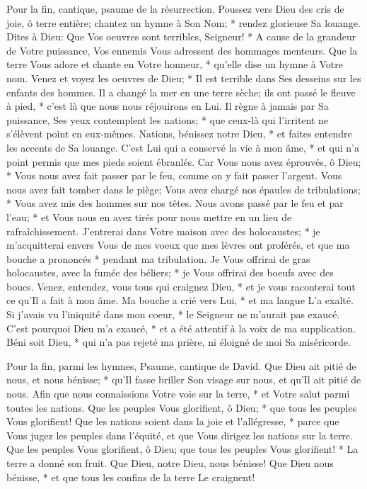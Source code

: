 Pour la fin, cantique, psaume de la résurrection. Poussez vers Dieu des cris de joie, ô terre entière;
chantez un hymne à Son Nom; * rendez glorieuse Sa louange.
Dites à Dieu: Que Vos oeuvres sont terribles, Seigneur! * A cause de la grandeur de Votre puissance, Vos ennemis Vous adressent des hommages menteurs.
Que la terre Vous adore et chante en Votre honneur, * qu'elle dise un hymne à Votre nom.
Venez et voyez les oeuvres de Dieu; * Il est terrible dans Ses desseins sur les enfants des hommes.
Il a changé la mer en une terre sèche; ils ont passé le fleuve à pied, * c'est là que nous nous réjouirons en Lui.
Il règne à jamais par Sa puissance, Ses yeux contemplent les nations; * que ceux-là qui l'irritent ne s'élèvent point en eux-mêmes.
Nations, bénissez notre Dieu, * et faites entendre les accents de Sa louange.
C'est Lui qui a conservé la vie à mon âme, * et qui n'a point permis que mes pieds soient ébranlés.
Car Vous nous avez éprouvés, ô Dieu; * Vous nous avez fait passer par le feu, comme on y fait passer l'argent.
Vous nous avez fait tomber dans le piège; Vous avez chargé nos épaules de tribulations; *
Vous avez mis des hommes sur nos têtes. Nous avons passé par le feu et par l'eau; * et Vous nous en avez tirés pour nous mettre en un lieu de rafraîchissement.
J'entrerai dans Votre maison avec des holocaustes; * je m'acquitterai envers Vous de mes voeux
que mes lèvres ont proférés, et que ma bouche a prononcés * pendant ma tribulation.
Je Vous offrirai de gras holocaustes, avec la fumée des béliers; * je Vous offrirai des boeufs avec des boucs.
Venez, entendez, vous tous qui craignez Dieu, * et je vous raconterai tout ce qu'Il a fait à mon âme.
Ma bouche a crié vers Lui, * et ma langue L'a exalté.
Si j'avais vu l'iniquité dans mon coeur, * le Seigneur ne m'aurait pas exaucé.
C'est pourquoi Dieu m'a exaucé, * et a été attentif à la voix de ma supplication.
Béni soit Dieu, * qui n'a pas rejeté ma prière, ni éloigné de moi Sa miséricorde.

Pour la fin, parmi les hymnes, Psaume, cantique de David.
Que Dieu ait pitié de nous, et nous bénisse; * qu'Il fasse briller Son visage sur nous, et qu'Il ait pitié de nous.
Afin que nous connaissions Votre voie sur la terre, * et Votre salut parmi toutes les nations.
Que les peuples Vous glorifient, ô Dieu; * que tous les peuples Vous glorifient!
Que les nations soient dans la joie et l'allégresse, * parce que Vous jugez les peuples dans l'équité, et que Vous dirigez les nations sur la terre.
Que les peuples Vous glorifient, ô Dieu; que tous les peuples Vous glorifient! *
La terre a donné son fruit. Que Dieu, notre Dieu, nous bénisse!
Que Dieu nous bénisse, * et que tous les confins de la terre Le craignent!


